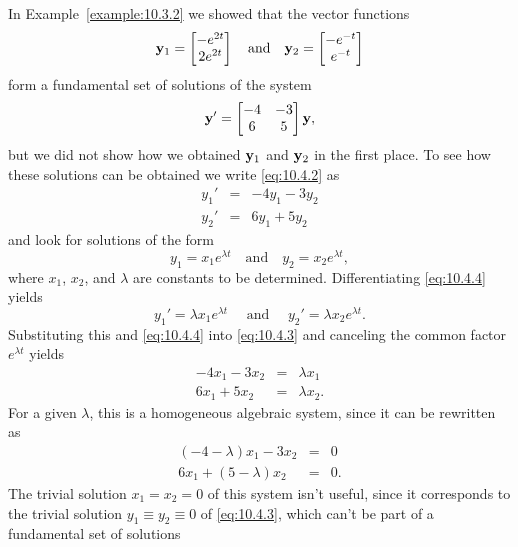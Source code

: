 \documentclass{ximera}
\begin{document}
In Example~\ref{example:10.3.2} we showed that the vector
functions
$$
{\bf y}_1=\begin{bmatrix} -e^{2t}\\2e^{2t}\end{bmatrix}\quad\mbox{and}\quad
{\bf y}_2=\begin{bmatrix}-e^{-t}\\e^{-t}\end{bmatrix}
$$
form a fundamental set of solutions of the system
\begin{equation}\label{eq:10.4.2}
{\bf y}'=\begin{bmatrix}-4&-3\\6&5\end{bmatrix} {\bf y},
\end{equation}
but we did not show how we obtained ${\bf y}_1$ and ${\bf y}_2$ in the
first place. To see how these solutions can be obtained we write
\eqref{eq:10.4.2} as
\begin{equation}\label{eq:10.4.3}
\begin{array}{ccc}
y_1'&=&-4y_1-3y_2\\y_2'&=&6y_1+5y_2\end{array}
\end{equation}
and look for solutions of the form
\begin{equation}\label{eq:10.4.4}
y_1=x_1e^{\lambda t}\quad\mbox{and}\quad y_2=x_2e^{\lambda t},
\end{equation}
where $x_1$, $x_2$, and $\lambda$ are constants to be determined.
 Differentiating  \eqref{eq:10.4.4} yields
$$
y_1'=\lambda x_1e^{\lambda
t}\quad\mbox{ and }\quad y_2'=\lambda x_2e^{\lambda t}.
$$
Substituting this and  \eqref{eq:10.4.4} into  \eqref{eq:10.4.3} and canceling
the common factor $e^{\lambda t}$ yields
$$
\begin{array}{ccc}-4x_1-3x_2&=&\lambda x_1 \\
6 x_1+5x_2&=&\lambda x_2.\end{array}
$$
For a given $\lambda$, this is a homogeneous algebraic system, since it can
be rewritten as
\begin{equation}\label{eq:10.4.5}
\begin{array}{rcl} (-4-\lambda) x_1-3 x_2&=&0\\
6 x_1+(5-\lambda) x_2&=&0.\end{array}
\end{equation}
The trivial solution $x_1=x_2=0$ of this system isn't  useful, since
it corresponds to the trivial solution $y_1\equiv y_2\equiv0$ of
\eqref{eq:10.4.3}, which can't be part of a fundamental set of solutions
\end{document}
